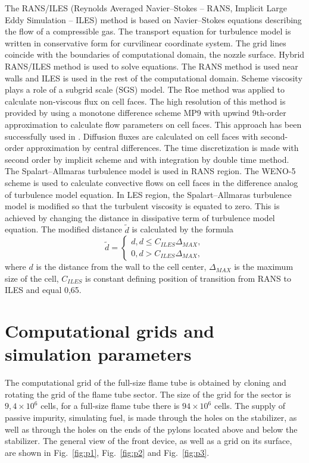 \documentclass[
11pt,%
tightenlines,%
twoside,%
onecolumn,%
nofloats,%
nobibnotes,%
nofootinbib,%
superscriptaddress,%
noshowpacs,%
centertags]%
{revtex4}
\begin{document}
The RANS/ILES (Reynolds Averaged Navier--Stokes -- RANS, Implicit
Large Eddy Simulation -- ILES) method is based on Navier--Stokes
equations describing the flow of a compressible gas. The transport
equation for turbulence model is written in conservative form for
curvilinear coordinate system. The grid lines coincide with the
boundaries of computational domain, the nozzle surface. Hybrid
RANS/ILES method \cite{i1,Ben_Lyub_Chest_RANS_ILES} is used to solve
equations. The RANS method is used near walls and ILES is used in
the rest of the computational domain. Scheme viscosity plays a role
of a subgrid scale (SGS) model. The Roe method was applied to
calculate non-viscous flux on cell faces. The high resolution of
this method is provided by using a monotone difference scheme MP9
\cite{i2} with upwind 9th-order approximation to calculate flow
parameters on cell faces. This approach has been successfully used
in \cite{i3}. Diffusion fluxes are calculated on cell faces with
second-order approximation by central differences. The time
discretization is made with second order by implicit scheme and with
integration by double time method. The Spalart--Allmaras turbulence
model is used in RANS region. The WENO-5 scheme \cite{i2} is used to
calculate convective flows on cell faces in the difference analog of
turbulence model equation. In LES region, the Spalart--Allmaras
turbulence model is modified so that the turbulent viscosity is
equated to zero.
This is achieved by changing the distance in dissipative term of
 turbulence model equation. The modified distance $\tilde{d}$ is calculated by the formula %
\begin{equation}
\label{eqn:d}
\tilde{d} =
\begin{cases}
d, d \le C_{ILES}\Delta_{MAX},\\
0, d > C_{ILES}\Delta_{MAX},
\end{cases}
\end{equation}
where $d$ is the distance from the wall to the cell center,
$\Delta_{MAX}$ is the maximum size of the cell, $C_{ILES}$ is
constant defining position of transition from RANS to ILES and equal
0,65.

\section{Computational grids and simulation parameters}

The computational grid of the full-size flame tube is obtained by
cloning and rotating the grid of the flame tube sector. The size of
the grid for the sector is $9,4 \times 10^6$ cells, for a full-size
flame tube there is $94 \times 10^6$ cells. The supply of passive
impurity, simulating fuel, is made through the holes on the
stabilizer, as well as through the holes on the ends of the pylons
located above and below the stabilizer. The general view of the
front device, as well as a grid on its surface, are shown in
Fig.~\ref{fig:p1}, Fig.~\ref{fig:p2} and Fig.~\ref{fig:p3}.
\end{document}
